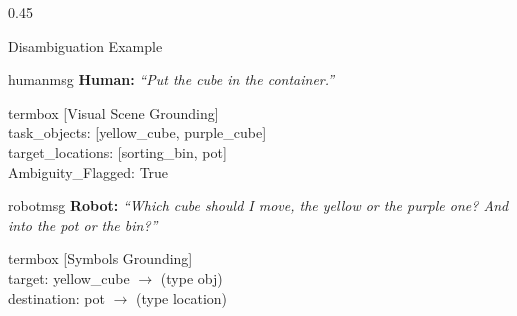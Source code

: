 \documentclass[10pt]{beamer}
\begin{document}
\begin{frame}[t]
\begin{columns}[T]
    \begin{column}{0.45\textwidth}
        \begin{block}{Disambiguation Example}
            \scriptsize

            \begin{beamercolorbox}[sep=4pt,rounded=true,wd=0.92\linewidth]{humanmsg}
                \tiny \textbf{Human:} \textit{``Put the cube in the container.''}
            \end{beamercolorbox}
            
            \vspace{0.1cm}
            \begin{beamercolorbox}[sep=4pt,wd=\linewidth]{termbox}
                \ttfamily\tiny
                [Visual Scene Grounding] \\
                task\_objects: [yellow\_cube, purple\_cube]\\
                target\_locations: [sorting\_bin, pot]\\
                \textcolor{myred}{Ambiguity\_Flagged: True}
            \end{beamercolorbox}

            \vspace{0.15cm}
            \begin{beamercolorbox}[sep=4pt,rounded=true,wd=0.92\linewidth]{robotmsg}
                \tiny \textbf{Robot:} \textit{``Which cube should I move, the yellow or the purple one? And into the pot or the bin?''}
            \end{beamercolorbox}
            
            \vspace{0.05cm}
            \vspace{0.1cm}

            \begin{beamercolorbox}[sep=4pt,wd=\linewidth]{termbox}
                \ttfamily\tiny
                [Symbols Grounding] \\
                target: yellow\_cube $\to$ (type obj)\\
                destination: pot $\to$ (type location)
            \end{beamercolorbox}
        \end{block}
    \end{column}
\end{columns}
\end{frame}
\end{document}

